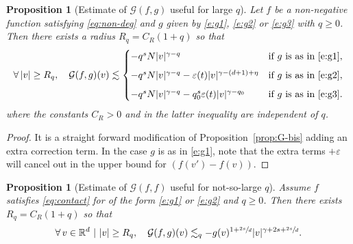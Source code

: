 \documentclass[JEP,XML,SOM,Unicode,NoFloatCountersInSection]{cedram}
\theoremstyle{plain}
\newtheorem{prop}[thm]{Proposition}
\theoremstyle{definition}
\numberwithin{equation}{section}
\newcommand{\R}{\mathbb R}
\newcommand{\eps}{\varepsilon}
\let\A N
\begin{document}
\begin{prop}[Estimate of {$\mathcal{G}(f,g)$} useful for large
$q$] \label{prop:G-bis2} Let $f$ be a non-negative function satisfying \eqref{eq:non-deg} and $g$
given by \eqref{e:g1}, \eqref{e:g2} or \eqref{e:g3} with $q \ge
0$. Then there exists a radius $R_q = C_R (1+q)$ so that
\[
\forall \, |v| \geq R_q, \quad
\mathcal{G} (f,g)(v)
\lesssim \begin{cases}
- q^s \A |v|^{\gamma-q} & \text{if $g$ is as in \eqref{e:g1}}, \\[2mm]
- q^s \A |v|^{\gamma-q} - \eps(t) |v|^{\gamma-(d+1)+\eta} & \text{if $g$ is as in \eqref{e:g2}}, \\[2mm]
- q^s \A |v|^{\gamma-q} - q_0^s \eps(t) |v|^{\gamma-q_0} & \text{if $g$ is as in \eqref{e:g3}}.
\end{cases}
\]
where the constants $C_R >0$ and in the latter inequality are
independent of $q$.
\end{prop}

\begin{proof} It is a straight forward modification of
Proposition~\ref{prop:G-bis} adding an extra correction term. In the
case $g$ is as in \eqref{e:g1}, note that the extra terms $+\eps$
will cancel out in the upper bound for $(f(v') - f(v))$.
\end{proof}

\begin{prop}[Estimate of {$\mathcal{G}(f,f)$} useful for not-so-large
$q$] \label{prop:G2} Assume $f$ satisfies \eqref{eq:contact} for of
the form \eqref{e:g1} or \eqref{e:g2} and $q \ge 0$. Then there
exists $R_q=C_R(1+q)$ so that
\[ \forall \, v \in \R^d \ | \ |v| \ge R_q, \quad \mathcal{G}
(f,g)(v) \lesssim_q - g(v)^{1+\sfrac{2s}d}
|v|^{\gamma+2s+\sfrac{2s}d}.
\]
\end{prop}
\end{document}
